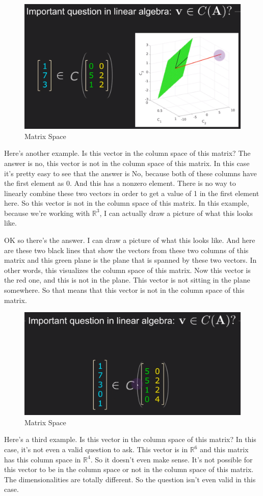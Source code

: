 \documentclass[fleqn,10pt]{olplainarticle}
\theoremstyle{definition}
\theoremstyle{remark}
\begin{document}
\begin{figure}[ht]
	\centering
	\includegraphics[width=0.5\linewidth]{images/matrix-space-05.png}
	\caption{Matrix Space}
	\label{fig:matrix_space_05}
\end{figure}

Here's another example. Is this vector in the column space of this matrix? The answer is no, this vector is not in the column space of this matrix. In this case it's pretty easy to see that the answer is No, because both of these columns have the first element as 0. And this has a nonzero element. There is no way to linearly combine these two vectors in order to get a value of 1 in the first element here. So this vector is not in the column space of this matrix. In this example, because we're working with $\mathbb{R}^3$, I can actually draw a picture of what this looks like.

OK so there's the answer. I can draw a picture of what this looks like. And here are these two black lines that show the vectors from these two columns of this matrix and this green plane is the plane that is spanned by these two vectors. In other words, this visualizes the column space of this matrix. Now this vector is the red one, and this is not in the plane. This vector is not sitting in the plane somewhere. So that means that this vector is not in the column space of this matrix.

\begin{figure}[ht]
	\centering
	\includegraphics[width=0.5\linewidth]{images/matrix-space-06.png}
	\caption{Matrix Space}
	\label{fig:matrix_space_06}
\end{figure}

Here's a third example. Is this vector in the column space of this matrix? In this case, it's not even a valid question to ask. This vector is in $\mathbb{R}^6$ and this matrix has this column space in $\mathbb{R}^4$. So it doesn't even make sense. It's not possible for this vector to be in the column space or not in the column space of this matrix. The dimensionalities are totally different. So the question isn't even valid in this case.
\end{document}
